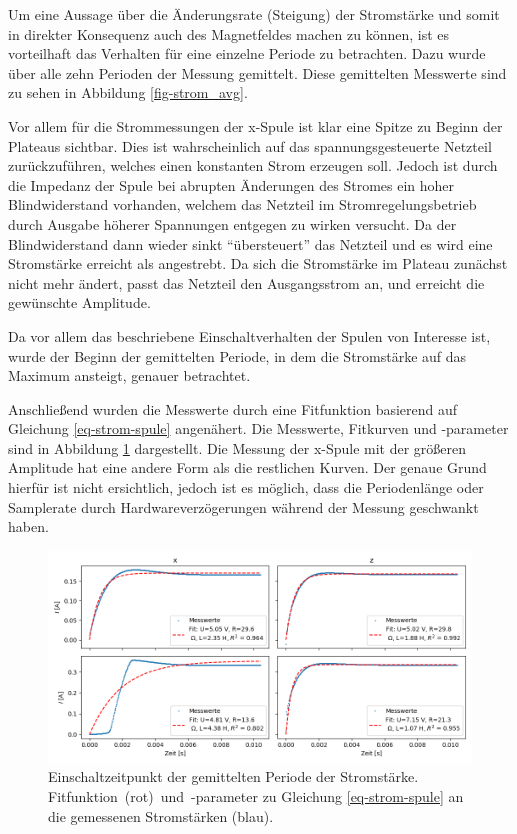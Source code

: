 \documentclass[page,pdftex,12pt,a4paper,twoside,openright]{scrbook}
\begin{document}
Um eine Aussage über die Änderungsrate (Steigung) der Stromstärke und somit in direkter Konsequenz auch des Magnetfeldes machen zu können, ist es vorteilhaft das Verhalten für eine einzelne Periode zu betrachten. Dazu wurde über alle zehn Perioden der Messung gemittelt. Diese gemittelten Messwerte sind zu sehen in Abbildung \ref{fig-strom_avg}.

Vor allem für die Strommessungen der x-Spule ist klar eine Spitze zu Beginn der Plateaus sichtbar. Dies ist wahrscheinlich auf das spannungsgesteuerte Netzteil zurückzuführen, welches einen konstanten Strom erzeugen soll. Jedoch ist durch die Impedanz der Spule bei abrupten Änderungen des Stromes ein hoher Blindwiderstand vorhanden, welchem das Netzteil im Stromregelungsbetrieb durch Ausgabe höherer Spannungen entgegen zu wirken versucht. Da der Blindwiderstand dann wieder sinkt "`übersteuert"' das Netzteil und es wird eine Stromstärke erreicht als angestrebt. Da sich die Stromstärke im Plateau zunächst nicht mehr ändert, passt das Netzteil den Ausgangsstrom an, und erreicht die gewünschte Amplitude.

Da vor allem das beschriebene Einschaltverhalten der Spulen von Interesse ist, wurde der Beginn der gemittelten Periode, in dem die Stromstärke auf das Maximum ansteigt, genauer betrachtet.

Anschließend wurden die Messwerte durch eine Fitfunktion basierend auf Gleichung \ref{eq-strom-spule} angenähert. Die Messwerte, Fitkurven und -parameter sind in Abbildung \ref{fig-stromfit} dargestellt. Die Messung der x-Spule mit der größeren Amplitude hat eine andere Form als die restlichen Kurven. Der genaue Grund hierfür ist nicht ersichtlich, jedoch ist es möglich, dass die Periodenlänge oder Samplerate durch Hardwareverzögerungen während der Messung geschwankt haben. 

\begin{figure}[h]
\centering
\includegraphics[width=\textwidth]{img/strom_fit.png}
\caption{\label{fig-stromfit}
Einschaltzeitpunkt der gemittelten Periode der Stromstärke. \mbox{Fitfunktion (rot) und -parameter} zu Gleichung \ref{eq-strom-spule} an die gemessenen Stromstärken (blau).}
\end{figure}
\end{document}

